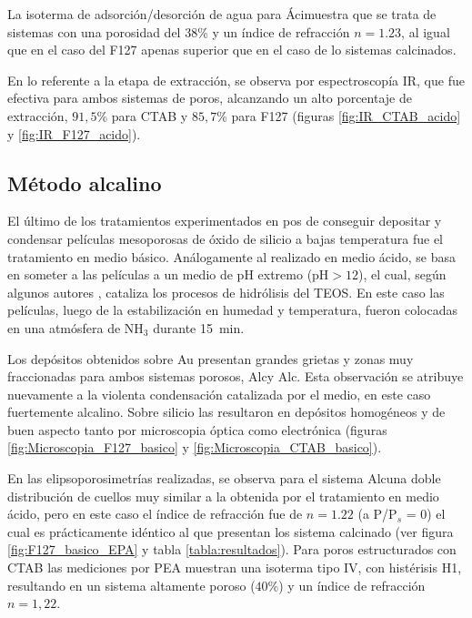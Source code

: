 		 La isoterma de adsorción/desorción de agua para Áci\pdmC\space muestra que se trata de sistemas con una porosidad del 38\% y un índice de refracción $n=1.23$, al igual que en el caso del F127 apenas superior que en el caso de lo sistemas calcinados.
		
		 En lo referente a la etapa de extracción, se observa por espectroscopía IR, que fue efectiva para ambos sistemas de poros, alcanzando un alto porcentaje de extracción, $91,5$\% para CTAB y $85,7$\% para F127 (figuras \ref{fig:IR_CTAB_acido} y \ref{fig:IR_F127_acido}).  	
				
	 \subsection{Método alcalino}

	 	 El último de los tratamientos experimentados en pos de conseguir depositar y condensar películas mesoporosas de óxido de silicio a bajas temperatura fue el tratamiento en medio básico. Análogamente al realizado en medio ácido, se basa en someter a las películas a un medio de pH extremo (pH$>12$), el cual, según algunos autores \cite{Soler-Illia2011,Huo1996,Ichinose2002,GonzalezSolveyra2017}, cataliza los procesos de hidrólisis del TEOS. En este caso las películas, luego de la estabilización en humedad y temperatura, fueron colocadas en una atmósfera de NH$_3$ durante \SI{15}{\minute}. 

		 Los depósitos obtenidos sobre Au presentan grandes grietas y zonas muy fraccionadas para ambos sistemas porosos, Alc\pdmF\space y Alc\pdmC. Esta observación se atribuye nuevamente a la violenta condensación catalizada por el medio, en este caso fuertemente alcalino. Sobre silicio las \pdm\space resultaron en depósitos homogéneos y de buen aspecto tanto por microscopia óptica como electrónica (figuras \ref{fig:Microscopia_F127_basico} y \ref{fig:Microscopia_CTAB_basico}).

		 En las elipsoporosimetrías realizadas, se observa para el sistema Alc\pdmF\space una doble distribución de cuellos muy similar a la obtenida por el tratamiento en medio ácido, pero en este caso el índice de refracción fue de $n=1.22$ (a P/P$_s$ = 0) el cual es prácticamente idéntico al que presentan los sistema calcinado (ver figura \ref{fig:F127_basico_EPA} y tabla \ref{tabla:resultados}). Para poros estructurados con CTAB las mediciones por PEA muestran una isoterma tipo IV, con histérisis H1, resultando en un sistema altamente poroso ($40\%$) y un índice de refracción $n=1,22$.
	
